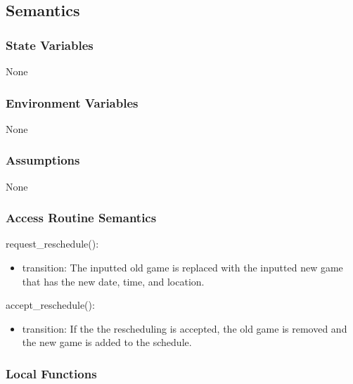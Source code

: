 \documentclass[12pt, titlepage]{article}
\begin{document}
\subsection{Semantics}

\subsubsection{State Variables}

None

\subsubsection{Environment Variables}

None

\subsubsection{Assumptions}


None

\subsubsection{Access Routine Semantics}

\noindent request\_reschedule():
\begin{itemize}
\item transition: The inputted old game is replaced with the inputted new game that has
      the new date, time, and location.
\end{itemize}

\noindent accept\_reschedule():
\begin{itemize}
\item transition: If the the rescheduling is accepted, the old game is removed and the
      new game is added to the schedule.
\end{itemize}

\subsubsection{Local Functions}

\end{document}
